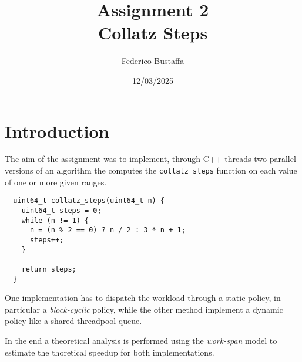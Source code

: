 \documentclass[12pt, a4paper]{article}
\title{Assignment 2\\Collatz Steps}
\author{Federico Bustaffa}
\date{12/03/2025}
\begin{document}
\maketitle
\tableofcontents
\clearpage

\section{Introduction}

The aim of the assignment was to implement, through C++ threads two parallel
versions of an algorithm the computes the \verb|collatz_steps| function on each
value of one or more given ranges.

\begin{verbatim}
  uint64_t collatz_steps(uint64_t n) {
    uint64_t steps = 0;
    while (n != 1) {
      n = (n % 2 == 0) ? n / 2 : 3 * n + 1;
      steps++;
    }

    return steps;
  }
\end{verbatim}

One implementation has to dispatch the workload through a static policy, in
particular a \emph{block-cyclic} policy, while the other method implement a
dynamic policy like a shared threadpool queue.

In the end a theoretical analysis is performed using the \emph{work-span} model
to estimate the thoretical speedup for both implementations.
\end{document}
